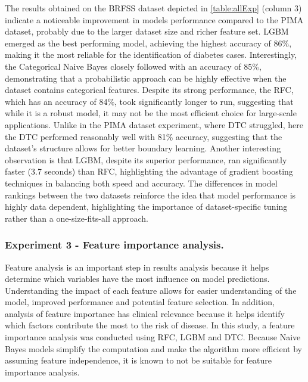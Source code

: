 \documentclass[runningheads]{llncs}
\begin{document}
The results obtained on the BRFSS dataset depicted in \autoref{table:allExp}  (column 3) indicate a noticeable improvement in models performance compared to the PIMA dataset, probably due to the larger dataset size and richer feature set. 
LGBM emerged as the best performing model, achieving the highest accuracy of 86\%, making it the most reliable for the identification of diabetes cases. Interestingly, the Categorical Naive Bayes closely followed with an accuracy of 85\%, demonstrating that a probabilistic approach can be highly effective when the dataset contains categorical features. Despite its strong performance, the RFC, which has an accuracy of 84\%, took significantly longer to run, suggesting that while it is a robust model, it may not be the most efficient choice for large-scale applications. 
Unlike in the PIMA dataset experiment, where DTC struggled, here the DTC performed reasonably well with 81\% accuracy, suggesting that the dataset's structure allows for better boundary learning. Another interesting observation is that LGBM, despite its superior performance, ran significantly faster (3.7 seconds) than RFC, highlighting the advantage of gradient boosting techniques in balancing both speed and accuracy. 
The differences in model rankings between the two datasets reinforce the idea that model performance is highly data dependent, highlighting the importance of dataset-specific tuning rather than a one-size-fits-all approach.


\subsubsection{Experiment 3 - Feature importance analysis.}

Feature analysis is an important step in results analysis because it helps determine which variables have the most influence on model predictions. Understanding the impact of each feature allows for easier understanding of the model, improved performance and potential feature selection. In addition, analysis of feature importance has clinical relevance because it helps identify which factors contribute the most to the risk of disease.
In this study, a feature importance analysis was conducted using RFC, LGBM and DTC. 
Because Naive Bayes models simplify the computation and make the algorithm more efficient by assuming feature independence, it is known to not be suitable for feature importance analysis.
\end{document}
